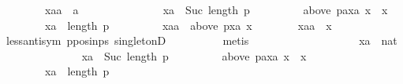 \begin{isabellebody}
\ \ \ \ \ \ \ \ xaa\ {\isacharcolon}{\kern0pt}{\isacharcolon}{\kern0pt}\ {\isachardoublequoteopen}{\isacharprime}{\kern0pt}a{\isachardoublequoteclose}\isanewline
\ \ \ \ \ \ \isamarkupfalse%
\isanewline
\ \ \ \ \ \ \ \ {\isachardoublequoteopen}xa\ {\isacharless}{\kern0pt}\ Suc\ {\isacharparenleft}{\kern0pt}length\ p{\isacharparenright}{\kern0pt}{\isachardoublequoteclose}\ \isanewline
\ \ \ \ \ \ \ \ {\isachardoublequoteopen}above\ {\isacharparenleft}{\kern0pt}{\isacharparenleft}{\kern0pt}p{\isacharat}{\kern0pt}{\isacharbrackleft}{\kern0pt}a{\isacharbrackright}{\kern0pt}{\isacharparenright}{\kern0pt}{\isacharbang}{\kern0pt}xa{\isacharparenright}{\kern0pt}\ x\ {\isacharequal}{\kern0pt}\ {\isacharbraceleft}{\kern0pt}x{\isacharbraceright}{\kern0pt}{\isachardoublequoteclose}\ \isanewline
\ \ \ \ \ \ \ \ {\isachardoublequoteopen}xa\ {\isasymnoteq}\ length\ p{\isachardoublequoteclose}\ \isanewline
\ \ \ \ \ \ \ \ {\isachardoublequoteopen}xaa\ {\isasymin}\ above\ {\isacharparenleft}{\kern0pt}p{\isacharbang}{\kern0pt}xa{\isacharparenright}{\kern0pt}\ x{\isachardoublequoteclose}\isanewline
\ \ \ \ \ \ \isamarkupfalse%
\ {\isachardoublequoteopen}xaa\ {\isacharequal}{\kern0pt}\ x{\isachardoublequoteclose}\isanewline
\ \ \ \ \ \ \ \ \isamarkupfalse%
\ less{\isacharunderscore}{\kern0pt}antisym\ p{\isacharunderscore}{\kern0pt}pos{\isacharunderscore}{\kern0pt}in{\isacharunderscore}{\kern0pt}ps\ singletonD\isanewline
\ \ \ \ \ \ \ \ \isamarkupfalse%
\ metis\isanewline
\ \ \ \ \isamarkupfalse%
\isanewline
\ \ \ \ \ \ \isamarkupfalse%
\isanewline
\ \ \ \ \ \ \ \ xa\ {\isacharcolon}{\kern0pt}{\isacharcolon}{\kern0pt}\ nat\isanewline
\ \ \ \ \ \ \isamarkupfalse%
\isanewline
\ \ \ \ \ \ \ \ {\isachardoublequoteopen}xa\ {\isacharless}{\kern0pt}\ Suc\ {\isacharparenleft}{\kern0pt}length\ p{\isacharparenright}{\kern0pt}{\isachardoublequoteclose}\ \isanewline
\ \ \ \ \ \ \ \ {\isachardoublequoteopen}above\ {\isacharparenleft}{\kern0pt}{\isacharparenleft}{\kern0pt}p{\isacharat}{\kern0pt}{\isacharbrackleft}{\kern0pt}a{\isacharbrackright}{\kern0pt}{\isacharparenright}{\kern0pt}{\isacharbang}{\kern0pt}xa{\isacharparenright}{\kern0pt}\ x\ {\isacharequal}{\kern0pt}\ {\isacharbraceleft}{\kern0pt}x{\isacharbraceright}{\kern0pt}{\isachardoublequoteclose}\ \isanewline
\ \ \ \ \ \ \ \ {\isachardoublequoteopen}xa\ {\isasymnoteq}\ length\ p{\isachardoublequoteclose}\isanewline
\ \ \ \ \ \ \isamarkupfalse%

\end{isabellebody}
